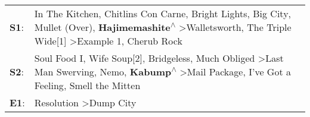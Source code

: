 \begin{supertabular}{p{0.03\textwidth}p{0.92\textwidth}}
 \textbf{S1}:  &                  In The Kitchen\textsuperscript{}, \enspace Chitlins Con Carne\textsuperscript{}, \enspace Bright Lights, Big City\textsuperscript{}, \enspace Mullet (Over)\textsuperscript{}, \enspace \textbf{Hajimemashite\textsuperscript{$\wedge$}} \textgreater \enspace Walletsworth\textsuperscript{}, \enspace The Triple Wide[1]\textsuperscript{} \textgreater \enspace Example 1\textsuperscript{}, \enspace Cherub Rock\textsuperscript{}  \enspace  \\
 \textbf{S2}:  &  Soul Food I\textsuperscript{}, \enspace Wife Soup[2]\textsuperscript{}, \enspace Bridgeless\textsuperscript{}, \enspace Much Obliged\textsuperscript{} \textgreater \enspace Last Man Swerving\textsuperscript{}, \enspace Nemo\textsuperscript{}, \enspace \textbf{Kabump\textsuperscript{$\wedge$}} \textgreater \enspace Mail Package\textsuperscript{}, \enspace I've Got a Feeling\textsuperscript{}, \enspace Smell the Mitten\textsuperscript{}  \enspace  \\
 \textbf{E1}:  &                                                                                                                                                                                                                                                                                                                                                                          Resolution\textsuperscript{} \textgreater \enspace Dump City\textsuperscript{}  \enspace  \\
\end{supertabular}
